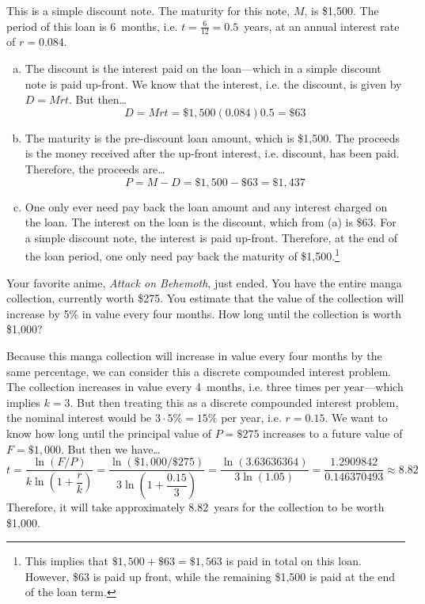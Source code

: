 \documentclass[12pt,letterpaper]{exam}
\begin{document}
\begin{questions}
\sol This is a simple discount note. The maturity for this note, $M$, is \$1,500. The period of this loan is 6~months, i.e. $t= \frac{6}{12}= 0.5$~years, at an annual interest rate of $r= 0.084$. 
        \begin{enumerate}[(a)]
        \item The discount is the interest paid on the loan---which in a simple discount note is paid up-front. We know that the interest, i.e. the discount, is given by $D= Mrt$. But then\dots
        		\[
		D= Mrt= \$1,\!500 (0.084) 0.5= \$63
		\] \pspace
	
        \item The maturity is the pre-discount loan amount, which is \$1,500. The proceeds is the money received after the up-front interest, i.e. discount, has been paid. Therefore, the proceeds are\dots
        		\[
		P= M - D= \$1,\!500 - \$63= \$1,\!437
		\] \pspace
	
        \item One only ever need pay back the loan amount and any interest charged on the loan. The interest on the loan is the discount, which from (a) is \$63. For a simple discount note, the interest is paid up-front. Therefore, at the end of the loan period, one only need pay back the maturity of \$1,500.\footnote{This implies that $\$1,\!500 + \$63= \$1,\!563$ is paid in total on this loan. However, \$63 is paid up front, while the remaining \$1,500 is paid at the end of the loan term.}
        \end{enumerate}



\newpage
\question[10] Your favorite anime, \textit{Attack on Behemoth}, just ended. You have the entire manga collection, currently worth \$275. You estimate that the value of the collection will increase by 5\% in value every four months. How long until the collection is worth \$1,000? \pspace

\sol Because this manga collection will increase in value every four months by the same percentage, we can consider this a discrete compounded interest problem. The collection increases in value every 4~months, i.e. three times per year---which implies $k= 3$. But then treating this as a discrete compounded interest problem, the nominal interest would be $3 \cdot 5\%= 15\%$ per year, i.e. $r= 0.15$. We want to know how long until the principal value of $P= \$275$ increases to a future value of $F= \$1,\!000$. But then we have\dots
	\[
	t= \dfrac{\ln(F/P)}{k \ln \left(1 + \dfrac{r}{k} \right)}= \dfrac{\ln(\$1,\!000/\$275)}{3 \ln \left(1 + \dfrac{0.15}{3} \right)}= \dfrac{\ln(3.63636364)}{3 \ln(1.05)}= \dfrac{1.2909842}{0.146370493} \approx 8.82
	\]
Therefore, it will take approximately 8.82~years for the collection to be worth \$1,000. \pspace


\end{questions}
\end{document}
